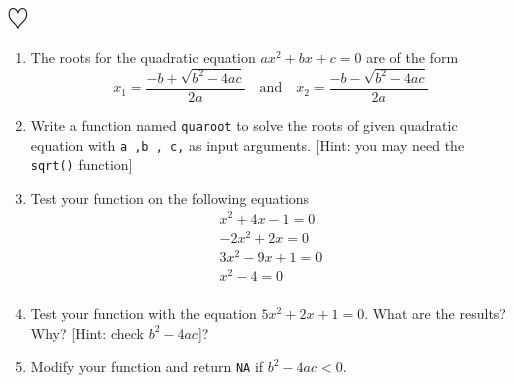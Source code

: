 \documentclass[a4paper]{article}
\begin{document}
\section{$\heartsuit$}
\begin{enumerate}
\item The roots for the quadratic equation $ax^2+bx+c=0$ are of the form
      \begin{equation*}
        \label{eq:1}
        x_1=\frac{-b + \sqrt {b^2-4ac}}{2a} \quad \text{and} \quad
        x_2=\frac{-b - \sqrt {b^2-4ac}}{2a}
      \end{equation*}
\item Write a function named \texttt{quaroot} to solve the roots of given
  quadratic equation with \texttt{a ,b , c,} as input
  arguments. [Hint: you may need the \texttt{sqrt()} function]
\item Test your function on the following equations
  \begin{equation*}
    \label{eq:2}
    \begin{split}
      x^2+4x-1=0\\
      -2x^2+2x=0\\
      3x^2-9x+1=0\\
      x^2 -4 = 0\\
    \end{split}
  \end{equation*}
\item Test your function with the equation $5x^2+2x+1=0$. What are the results? Why? [Hint: check $b^2-4ac$]?
\item Modify your function and return \texttt{NA} if $b^2-4ac < 0$.
\end{enumerate}





\end{document}

